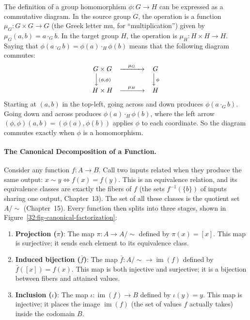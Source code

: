 The definition of a group homomorphism $\phi: G \to H$ can be expressed as a commutative diagram. In the source group $G$, the operation is a function $\mu_G: G \times G \to G$ (the Greek letter mu, for ``multiplication'') given by $\mu_G(a, b) = a \cdot_G b$. In the target group $H$, the operation is $\mu_H: H \times H \to H$. Saying that $\phi(a \cdot_G b) = \phi(a) \cdot_H \phi(b)$ means that the following diagram commutes:
\[
\begin{array}{ccc}
G \times G & \xrightarrow{\quad \mu_G \quad} & G \\
\Big\downarrow{\scriptstyle (\phi, \phi)} & & \Big\downarrow{\scriptstyle \phi} \\
H \times H & \xrightarrow{\quad \mu_H \quad} & H
\end{array}
\]
Starting at $(a, b)$ in the top-left, going across and down produces $\phi(a \cdot_G b)$. Going down and across produces $\phi(a) \cdot_H \phi(b)$, where the left arrow $(\phi, \phi)(a, b) = (\phi(a), \phi(b))$ applies $\phi$ to each coordinate. So the diagram commutes exactly when $\phi$ is a homomorphism.

\paragraph{The Canonical Decomposition of a Function.}
Consider any function $f: A \to B$. Call two inputs related when they produce the same output: $x \sim y \iff f(x) = f(y)$. This is an equivalence relation, and its equivalence classes are exactly the fibers of $f$ (the sets $f^{-1}(\{b\})$ of inputs sharing one output, Chapter~13). The set of all these classes is the quotient set $A/{\sim}$ (Chapter~15). Every function then splits into three stages, shown in Figure~\ref{32:fig-canonical-factorization}:
\begin{enumerate}
  \item \textbf{Projection ($\pi$)}: The map $\pi: A \to A/{\sim}$ defined by $\pi(x) = [x]$. This map is surjective; it sends each element to its equivalence class.
  \item \textbf{Induced bijection ($\bar{f}$)}: The map $\bar{f}: A/{\sim} \to \operatorname{im}(f)$ defined by $\bar{f}([x]) = f(x)$. This map is both injective and surjective; it is a bijection between fibers and attained values.
  \item \textbf{Inclusion ($\iota$)}: The map $\iota: \operatorname{im}(f) \to B$ defined by $\iota(y) = y$. This map is injective; it places the image $\operatorname{im}(f)$ (the set of values $f$ actually takes) inside the codomain $B$.
\end{enumerate}

